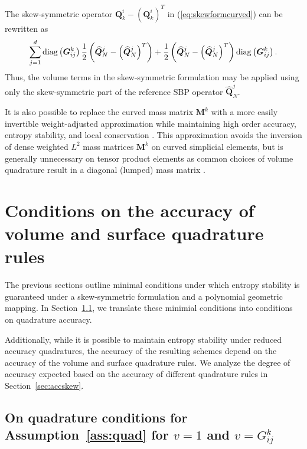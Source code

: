 \documentclass{svjour3}                     %
\renewcommand{\hat}{\widehat}
\newcommand{\diag}[1]{{\rm diag}\LRp{#1}}
\newcommand{\LRp}[1]{\left( #1 \right)}
\begin{document}
\begin{remark}
The skew-symmetric operator ${\bm{Q}^i_k - \LRp{\bm{Q}^i_k}^T}$ in (\ref{eq:skewformcurved}) can be rewritten as
\begin{align*}
\sum_{j=1}^d \diag{\bm{G}^k_{ij}}{ \frac{1}{2}\LRp{\hat{\bm{Q}}_N^j-\LRp{\hat{\bm{Q}}_N^j}^T}}+  \frac{1}{2} \LRp{\hat{\bm{Q}}_N^j-\LRp{\hat{\bm{Q}}_N^j}^T}\diag{\bm{G}^k_{ij}}.
\end{align*}
Thus, the volume terms in the skew-symmetric formulation may be applied using only the skew-symmetric part of the reference SBP operator $\hat{\bm{Q}}^j_N$.
\end{remark}

\begin{remark}
It is also possible to replace the curved mass matrix $\bm{M}^k$ with a more easily invertible weight-adjusted approximation while maintaining high order accuracy, entropy stability, and local conservation \cite{chan2018discretely}.  This approximation avoids the inversion of dense weighted $L^2$ mass matrices $\bm{M}^k$ on curved simplicial elements, but is generally unnecessary on tensor product elements as common choices of volume quadrature result in a diagonal (lumped) mass matrix \cite{carpenter2014entropy, parsani2016entropy, chan2018efficient}.
\end{remark}

\section{Conditions on the accuracy of volume and surface quadrature rules}

The previous sections outline minimal conditions under which entropy stability is guaranteed under a skew-symmetric formulation and a polynomial geometric mapping.  In Section~\ref{sec:curvgeo}, we translate these minimial conditions into conditions on quadrature accuracy.  

Additionally, while it is possible to maintain entropy stability under reduced accuracy quadratures, the accuracy of the resulting schemes depend on the accuracy of the volume and surface quadrature rules.  We analyze the degree of accuracy expected based on the accuracy of different quadrature rules in Section~\ref{sec:accskew}.  

\subsection{On quadrature conditions for Assumption~\ref{ass:quad} for $v = 1$ and $v = G^k_{ij}$}
\label{sec:curvgeo}
\end{document}
